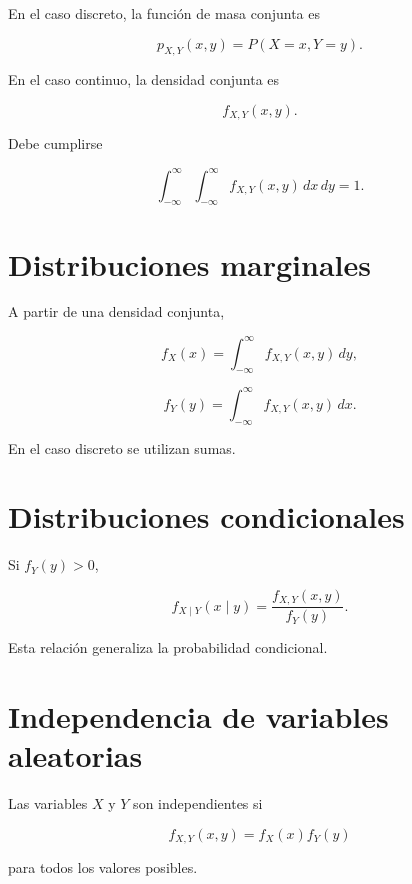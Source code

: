 \documentclass[
  spanish,
  10.5pt,
  letterpaper,
  DIV=11,
  numbers=noendperiod,
  oneside,
  open=any]{scrreprt}
\theoremstyle{definition}
\theoremstyle{definition}
\theoremstyle{plain}
\theoremstyle{remark}
\begin{document}
En el caso discreto, la función de masa conjunta es

\[
p_{X,Y}(x,y)
=
P(X=x,Y=y).
\]

En el caso continuo, la densidad conjunta es

\[
f_{X,Y}(x,y).
\]

Debe cumplirse

\[
\int_{-\infty}^{\infty}
\int_{-\infty}^{\infty}
f_{X,Y}(x,y)\,dx\,dy
=
1.
\]

\section*{Distribuciones marginales}\label{distribuciones-marginales}


A partir de una densidad conjunta,

\[
f_X(x)
=
\int_{-\infty}^{\infty}
f_{X,Y}(x,y)\,dy,
\]

\[
f_Y(y)
=
\int_{-\infty}^{\infty}
f_{X,Y}(x,y)\,dx.
\]

En el caso discreto se utilizan sumas.

\section*{Distribuciones
condicionales}\label{distribuciones-condicionales}


Si \(f_Y(y)>0\),

\[
f_{X\mid Y}(x\mid y)
=
\frac{
f_{X,Y}(x,y)
}{
f_Y(y)
}.
\]

Esta relación generaliza la probabilidad condicional.

\section*{Independencia de variables
aleatorias}\label{independencia-de-variables-aleatorias}


Las variables \(X\) y \(Y\) son independientes si

\[
f_{X,Y}(x,y)
=
f_X(x)f_Y(y)
\]

para todos los valores posibles.
\end{document}
